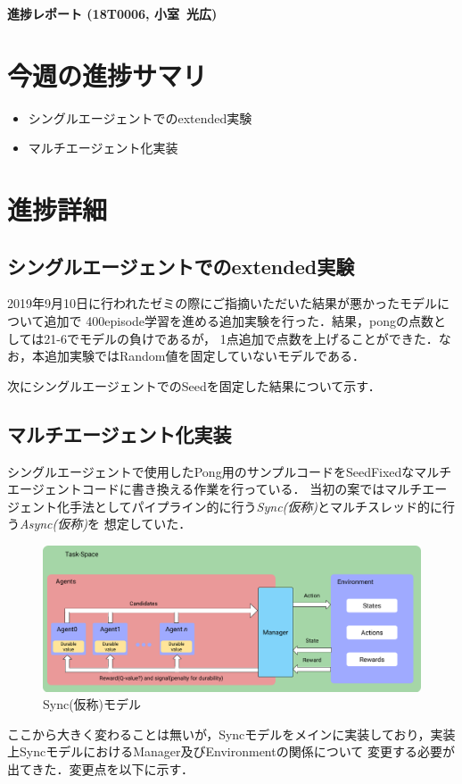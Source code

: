 \documentclass[11pt,a4paper]{jsarticle}
\def\stdid{18T0006}		%
\def\sirname{小室}		%
\def\firstname{光広}		%
\begin{document}

\noindent
\textbf{\large 進捗レポート (\stdid, \sirname\ \firstname)}		%

\section*{今週の進捗サマリ}			%

\begin{itemize}
  \item シングルエージェントでのextended実験
  \item マルチエージェント化実装
\end{itemize}

\section{進捗詳細}					%
\subsection{シングルエージェントでのextended実験}
2019年9月10日に行われたゼミの際にご指摘いただいた結果が悪かったモデルについて追加で
400episode学習を進める追加実験を行った．結果，pongの点数としては21-6でモデルの負けであるが，
1点追加で点数を上げることができた．なお，本追加実験ではRandom値を固定していないモデルである．\par
次にシングルエージェントでのSeedを固定した結果について示す．


\subsection{マルチエージェント化実装}
シングルエージェントで使用したPong用のサンプルコードをSeedFixedなマルチエージェントコードに書き換える作業を行っている．
当初の案ではマルチエージェント化手法としてパイプライン的に行う\textit{Sync(仮称)}とマルチスレッド的に行う\textit{Async(仮称)}を
想定していた．
\begin{figure}[htbp]
  \begin{center}
    \includegraphics[width=14cm]{fig1.png}
    \caption{Sync(仮称)モデル}
  \end{center}
  \label{fig1}
\end{figure}
ここから大きく変わることは無いが，Syncモデルをメインに実装しており，実装上SyncモデルにおけるManager及びEnvironmentの関係について
変更する必要が出てきた．変更点を以下に示す．
\end{document}
